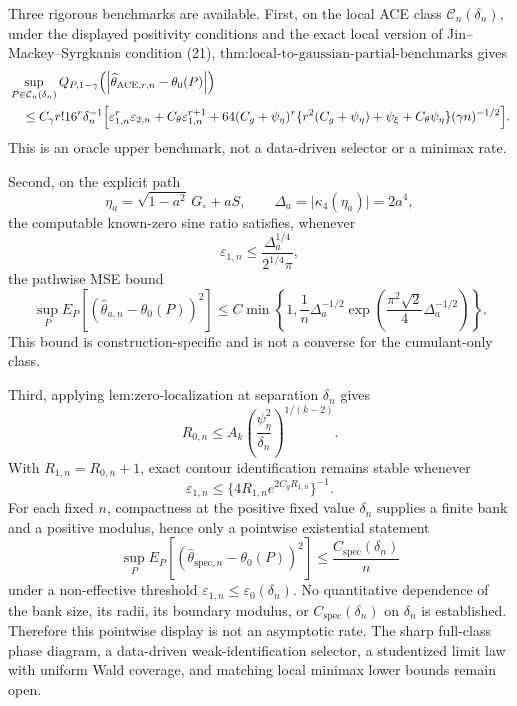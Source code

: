 Three rigorous benchmarks are available.  First, on the local ACE class \(\mathcal C_n(\delta_n)\), under the displayed positivity conditions and the exact local version of Jin--Mackey--Syrgkanis condition (21), \(\text{thm:local-to-gaussian-partial-benchmarks}\) gives
\[
\begin{aligned}
 &\sup_{P\in\mathcal C_n(\delta_n)}
 Q_{P,1-\gamma}\!\left(\left|\widehat\theta_{\mathrm{ACE},r,n}-\theta_0(P)\right|\right)\\
 &\quad\le C_{\gamma}r!16^r\delta_n^{-1}
 \Bigl[\varepsilon_{1,n}^r\varepsilon_{2,n}
 +C_{\theta}\varepsilon_{1,n}^{r+1}
 +64(C_g+\psi_{\eta})^r
 \{r^2(C_g+\psi_{\eta})+\psi_{\xi}+C_{\theta}\psi_{\eta}\}
 (\gamma n)^{-1/2}\Bigr].
\end{aligned}
\]
This is an oracle upper benchmark, not a data-driven selector or a minimax rate.

Second, on the explicit path
\[
 \eta_a=\sqrt{1-a^2}\,G_{\circ}+aS,
 \qquad
 \Delta_a=\lvert\kappa_4(\eta_a)\rvert=2a^4,
\]
the computable known-zero sine ratio satisfies, whenever
\[
 \varepsilon_{1,n}\le \frac{\Delta_a^{1/4}}{2^{1/4}\pi},
\]
the pathwise MSE bound
\[
 \sup_P E_P\!\left[(\widehat\theta_{a,n}-\theta_0(P))^2\right]
 \le C\min\!\left\{
 1,\frac{1}{n}\Delta_a^{-1/2}
 \exp\!\left(\frac{\pi^2\sqrt2}{4}\Delta_a^{-1/2}\right)
 \right\}.
\]
This bound is construction-specific and is not a converse for the cumulant-only class.

Third, applying \(\text{lem:zero-localization}\) at separation \(\delta_n\) gives
\[
 R_{0,n}\le A_k\left(\frac{\psi_{\eta}^2}{\delta_n}\right)^{1/(k-2)}.
\]
With \(R_{1,n}=R_{0,n}+1\), exact contour identification remains stable whenever
\[
 \varepsilon_{1,n}\le\{4R_{1,n}e^{2C_gR_{1,n}}\}^{-1}.
\]
For each fixed \(n\), compactness at the positive fixed value \(\delta_n\) supplies a finite bank and a positive modulus, hence only a pointwise existential statement
\[
 \sup_P E_P\!\left[(\widehat\theta_{\mathrm{spec},n}-\theta_0(P))^2\right]
 \le \frac{C_{\mathrm{spec}}(\delta_n)}{n}
\]
under a non-effective threshold \(\varepsilon_{1,n}\le\varepsilon_0(\delta_n)\).  No quantitative dependence of the bank size, its radii, its boundary modulus, or \(C_{\mathrm{spec}}(\delta_n)\) on \(\delta_n\) is established.  Therefore this pointwise display is not an asymptotic rate.  The sharp full-class phase diagram, a data-driven weak-identification selector, a studentized limit law with uniform Wald coverage, and matching local minimax lower bounds remain open.